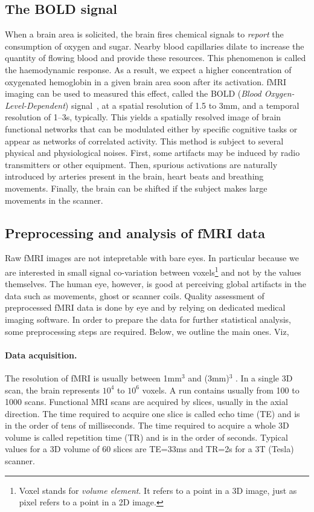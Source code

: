 \subsection{The BOLD signal}
When a brain area is solicited, the brain fires chemical signals to \textit{report}
the consumption of oxygen and sugar. Nearby blood capillaries dilate to increase the quantity
of flowing blood and provide these resources. This phenomenon is called the
haemodynamic response.
%
As a result, we expect a higher concentration of oxygenated hemoglobin
in a given brain area soon after its activation.
fMRI imaging can be used to measured this effect, called the BOLD (\textit{Blood Oxygen-Level-Dependent}) signal~\citep{agawa1990,ogawa1990b}, at a spatial resolution of 1.5 to 3mm, and a temporal resolution of 1--3s, typically. This yields a spatially resolved image of
brain functional networks that can be modulated
either by specific cognitive tasks or appear as
networks of correlated activity. This method is subject to several physical and physiological
noises. First,
some artifacts may be induced by radio transmitters or other equipment. Then,
spurious activations are naturally introduced by arteries present in
the brain, heart beats and breathing movements. Finally, the brain can be
shifted if the subject makes large movements in the scanner.

\subsection{Preprocessing and analysis of fMRI data}
Raw fMRI images are not intepretable with bare eyes. In particular because
we are interested in small signal co-variation between voxels\footnote{Voxel stands for \textit{volume element}. It refers
to a point in a 3D image, just as pixel refers to a point in a 2D image.}  and not by the
values themselves. The human eye, however, is good at perceiving global artifacts
in the data such as movements, ghost or scanner coils. Quality assessment of
preprocessed fMRI data is done by eye and by relying on dedicated medical
imaging software. In order to prepare the data for further statistical analysis,
some preprocessing steps are required. Below, we outline the main ones. Viz,

\paragraph{Data acquisition.}
The resolution of fMRI is usually between 1mm$^3$ and
(3mm)$^3$ . In a single 3D scan, the brain represents $10^4$ to $10^6$ voxels.
A run contains usually from 100 to 1000 scans. Functional MRI scans are
acquired by slices, usually in the axial direction. The time required to acquire
one slice is called echo time (TE) and is in the order of tens of milliseconds.
The time required to acquire a whole 3D volume is called repetition time (TR)
and is in the order of seconds. Typical values for a 3D volume of 60 slices are
TE=33ms and TR=2s for a 3T (Tesla) scanner.

